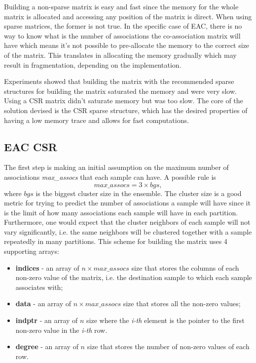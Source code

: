 Building a non-sparse matrix is easy and fast since the memory for the whole matrix is allocated and accessing any position of the matrix is direct.
When using sparse matrices, the former is not true.
In the specific case of EAC, there is no way to know what is the number of associations the co-association matrix will have which means it's not possible to pre-allocate the memory to the correct size of the matrix.
This translates in allocating the memory gradually which may result in fragmentation, depending on the implementation. 


Experiments showed that building the matrix with the recommended sparse structures for building the matrix saturated the memory and were very slow.
Using a CSR matrix didn't saturate memory but was too slow. %
The core of the solution devised is the CSR sparse structure, which has the desired properties of having a low memory trace and allows for fast computations.

\subsection{EAC CSR}

The first step is making an initial assumption on the maximum number of associations \emph{max\_assocs} that each sample can have.
A possible rule is $$max\_assocs = 3 \times bgs , $$ where $bgs$ is the biggest cluster size in the ensemble.
The cluster size is a good metric for trying to predict the number of associations a sample will have since it is the limit of how many associations each sample will have in each partition.
Furthermore, one would expect that the cluster neighbors of each sample will not vary significantly, i.e. the same neighbors will be clustered together with a sample repeatedly in many partitions.
This scheme for building the matrix uses 4 supporting arrays:

\begin{itemize}
	\item \textbf{indices} - an array of $n \times max\_assocs$ size that stores the columns of each non-zero value of the matrix, i.e. the destination sample to which each sample associates with;
	\item \textbf{data} - an array of $n \times max\_assocs$ size that stores all the non-zero values;
	\item \textbf{indptr} - an array of $n$ size where the \emph{i-th} element is the pointer to the first non-zero value in the \emph{i-th} row.
	\item \textbf{degree} - an array of $n$ size that stores the number of non-zero values of each row.
\end{itemize}

